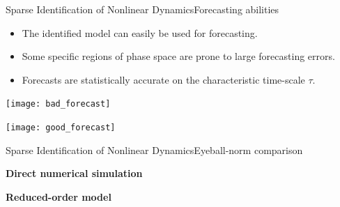 \begin{frame}[t, c]{Sparse Identification of Nonlinear Dynamics}{Forecasting abilities}
  \begin{minipage}{.48\textwidth}
    \begin{itemize}
    \item The identified model can easily be used for forecasting.
      
      \medskip
      
    \item Some specific regions of phase space are prone to large forecasting errors.
      
      \medskip
      
    \item Forecasts are statistically accurate on the characteristic time-scale \( \tau \).
    \end{itemize}
  \end{minipage}%
  \hfill
  \begin{minipage}{.48\textwidth}
    \begin{overprint}
      \centering
      \texttt{[image: bad\_forecast]}
      
      \centering
      \texttt{[image: good\_forecast]}
      
    \end{overprint}
  \end{minipage}
  
  \vspace{1cm}
\end{frame}

\begin{frame}[t, c]{Sparse Identification of Nonlinear Dynamics}{Eyeball-norm comparison}
  \begin{minipage}{.48\textwidth}
    \centering
    \begin{block}{}
      \centering
      \textbf{Direct numerical simulation}
    \end{block}
    \centering
  
  \end{minipage}%
  \hfill
  \begin{minipage}{.48\textwidth}
    \centering
    \begin{block}{}
      \centering
      \textbf{Reduced-order model}
    \end{block}
    \centering
  \end{minipage}
  \vspace{1cm}
\end{frame}